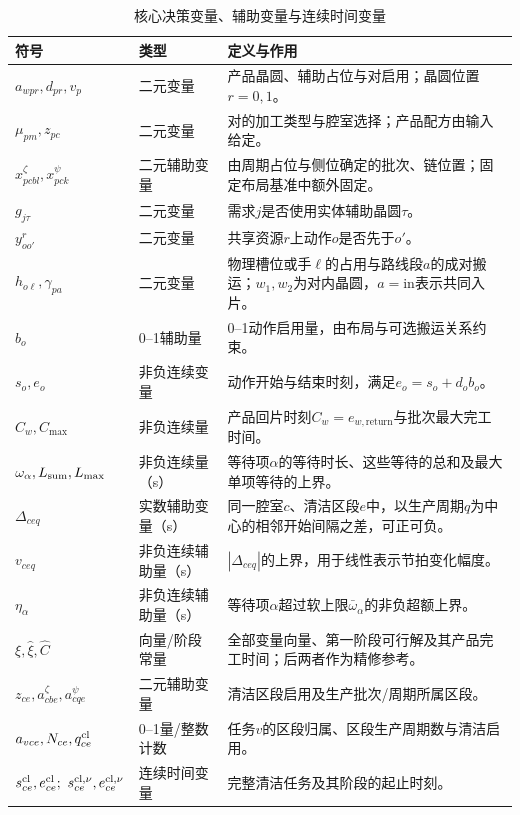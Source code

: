 \documentclass[final,5p,times,twocolumn]{elsarticle}
\begin{document}
\begin{table}[t]
\centering
\scriptsize
\setlength{\tabcolsep}{3pt}
\caption{核心决策变量、辅助变量与连续时间变量}
\label{tab:symbol-cn-b}
\begin{tabular}{C{0.20\textwidth}C{0.16\textwidth}C{0.43\textwidth}}
\toprule
符号 & 类型 & 定义与作用 \\
\midrule
$a_{wpr},d_{pr},v_p$ & 二元变量 & 产品晶圆、辅助占位与对启用；晶圆位置$r=0,1$。\\
$\mu_{pm},z_{pc}$ & 二元变量 & 对的加工类型与腔室选择；产品配方由输入给定。\\
$x^{\zeta}_{pcbl},x^{\psi}_{pck}$ & 二元辅助变量 & 由周期占位与侧位确定的批次、链位置；固定布局基准中额外固定。\\
$g_{j\tau}$ & 二元变量 & 需求$j$是否使用实体辅助晶圆$\tau$。\\
$y^r_{oo'}$ & 二元变量 & 共享资源$r$上动作$o$是否先于$o'$。\\
$h_{o\ell},\gamma_{pa}$ & 二元变量 & 物理槽位或手$\ell$的占用与路线段$a$的成对搬运；$w_1,w_2$为对内晶圆，$a=\mathrm{in}$表示共同入片。\\
$b_o$ & 0--1辅助量 & 0--1动作启用量，由布局与可选搬运关系约束。\\
$s_o,e_o$ & 非负连续变量 & 动作开始与结束时刻，满足$e_o=s_o+d_ob_o$。\\
$C_w,C_{\max}$ & 非负连续量 & 产品回片时刻$C_w=e_{w,\mathrm{return}}$与批次最大完工时间。\\
$\omega_\alpha,L_{\rm sum},L_{\max}$ & 非负连续量（s） & 等待项$\alpha$的等待时长、这些等待的总和及最大单项等待的上界。\\
$\Delta_{ceq}$ & 实数辅助变量（s） & 同一腔室$c$、清洁区段$e$中，以生产周期$q$为中心的相邻开始间隔之差，可正可负。\\
$v_{ceq}$ & 非负连续辅助量（s） & $|\Delta_{ceq}|$的上界，用于线性表示节拍变化幅度。\\
$\eta_\alpha$ & 非负连续辅助量（s） & 等待项$\alpha$超过软上限$\bar\omega_\alpha$的非负超额上界。\\
$\xi,\widehat\xi,\widehat C$ & 向量/阶段常量 & 全部变量向量、第一阶段可行解及其产品完工时间；后两者作为精修参考。\\
$z_{ce},a^{\zeta}_{cbe},a^{\psi}_{cqe}$ & 二元辅助变量 & 清洁区段启用及生产批次/周期所属区段。\\
$a_{vce},N_{ce},q^{\rm cl}_{ce}$ & 0--1量/整数计数 & 任务$v$的区段归属、区段生产周期数与清洁启用。\\
$s^{\rm cl}_{ce},e^{\rm cl}_{ce};\ s^{\rm cl,\nu}_{ce},e^{\rm cl,\nu}_{ce}$ & 连续时间变量 & 完整清洁任务及其阶段的起止时刻。\\

\end{tabular}
\end{table}
\end{document}
